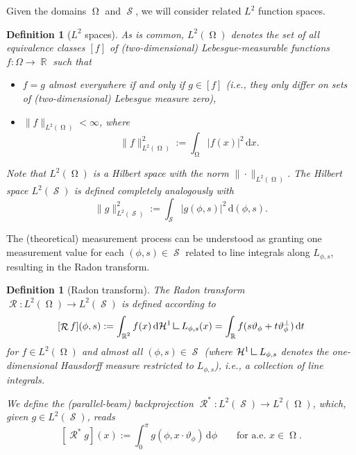 \documentclass[11pt,reqno]{amsart}
\DeclareMathOperator{\RR}{\mathbb{R}}
\newcommand{\mres}{\mathbin{\vrule height 1.6ex depth 0pt width
0.13ex\vrule height 0.13ex depth 0pt width 1.3ex}}
\DeclareMathOperator{\Radon}{\mathcal{R}}
\DeclareMathOperator{\imgdom}{\Omega}
\DeclareMathOperator{\sinodom}{\mathcal{S}}
\newcommand{\dd}[1]{\,\mathrm{d}{#1}}
\numberwithin{theorem}{section}
\newtheorem{definition}[theorem]{Definition}
\theoremstyle{remark}
\begin{document}
Given the domains $\imgdom$ and $\sinodom$, we will consider related $L^2$ function spaces.
\begin{definition}[$L^2$ spaces]
As is common, $L^2(\imgdom)$ denotes the set of all equivalence classes $[f]$ of (two-dimensional) Lebesgue-measurable functions $f\colon \Omega \to \RR$ such that 
\begin{itemize}
\item $f=g$ almost everywhere if and only if $g\in[f]$ (i.e., they only differ on sets of (two-dimensional) Lebesgue measure zero),
\item $\|f\|_{L^2(\imgdom)} < \infty$, where\begin{equation} \|f\|_{L^2(\imgdom)}^2 := \int_{\imgdom} |f(x)|^2\dd x.
\end{equation}
\end{itemize}
Note that $L^2(\imgdom)$ is a Hilbert space with the norm $\|\cdot\|_{L^2(\imgdom)}$. The Hilbert space $L^2(\sinodom)$ is defined completely analogously with 
\begin{equation}
\|g\|_{L^2(\sinodom)}^2 := \int_{\sinodom} |g(\phi,s)|^2\dd{(\phi,s)}.
\end{equation}




\end{definition}
	

The (theoretical) measurement process can be understood as granting one measurement value for each $(\phi,s)\in\sinodom$ related to line integrals along $L_{\phi,s}$, resulting in the Radon transform.
\begin{definition}[Radon transform]
The Radon transform $\Radon \colon L^2(\imgdom)\to L^2(\sinodom)$ is defined according to
\begin{align}
\label{equ_def_radon_transform}
[\Radon f](\phi,s):= \int_{\RR^2} f(x) \dd {\mathcal{H}^{1}\mres L_{\phi,s}}(x) = \int_{\RR} f(s\vartheta_\phi+t \vartheta_\phi^{\perp}) \dd t 
\end{align}
for $f\in L^2(\imgdom)$ and almost all $(\phi,s)\in \sinodom$ (where $\mathcal{H}^1\mres L_{\phi,s}$ denotes the one-dimensional Hausdorff measure restricted to $L_{\phi,s}$), i.e., a collection of line integrals.

We define the (parallel-beam) backprojection $\Radon^*\colon L^2(\sinodom)\to L^2(\imgdom)$, which,  given $g\in L^2(\sinodom)$, reads
\begin{equation} \label{equ_def_backprojection}
[\Radon^* g](x) := \int_{0}^{\pi} g(\phi,x\cdot \vartheta_\phi) \dd \phi  \qquad \text{for a.e. }x\in \imgdom.
\end{equation}
\end{definition}
\end{document}
